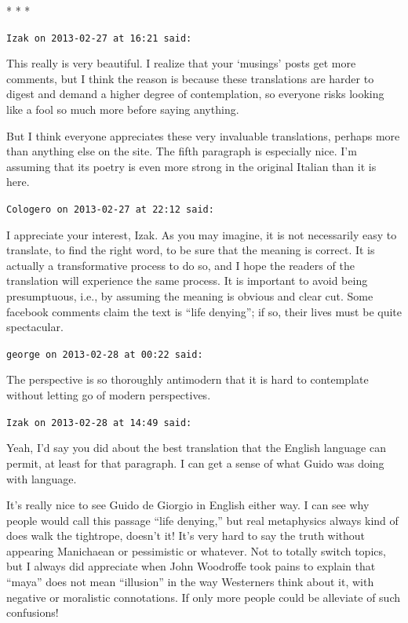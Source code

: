 
\begin{center}* * *\end{center}

\begin{footnotesize}
\begin{sffamily}
\texttt{Izak on 2013-02-27 at 16:21 said:}

This really is very beautiful. I realize that your `musings' posts get more comments, but I think the reason is because these translations are harder to digest and demand a higher degree of contemplation, so everyone risks looking like a fool so much more before saying anything.

But I think everyone appreciates these very invaluable translations, perhaps more than anything else on the site. The fifth paragraph is especially nice. I'm assuming that its poetry is even more strong in the original Italian than it is here.

\hfill

\texttt{Cologero on 2013-02-27 at 22:12 said:}

I appreciate your interest, Izak. As you may imagine, it is not necessarily easy to translate, to find the right word, to be sure that the meaning is correct. It is actually a transformative process to do so, and I hope the readers of the translation will experience the same process. It is important to avoid being presumptuous, i.e., by assuming the meaning is obvious and clear cut. Some facebook comments claim the text is ``life denying''; if so, their lives must be quite spectacular.

\hfill

\texttt{george on 2013-02-28 at 00:22 said:}

The perspective is so thoroughly antimodern that it is hard to contemplate without letting go of modern perspectives.

\hfill

\texttt{Izak on 2013-02-28 at 14:49 said:}

Yeah, I'd say you did about the best translation that the English language can permit, at least for that paragraph. I can get a sense of what Guido was doing with language.

It's really nice to see Guido de Giorgio in English either way. I can see why people would call this passage ``life denying,'' but real metaphysics always kind of does walk the tightrope, doesn't it! It's very hard to say the truth without appearing Manichaean or pessimistic or whatever. Not to totally switch topics, but I always did appreciate when John Woodroffe took pains to explain that ``maya'' does not mean ``illusion'' in the way Westerners think about it, with negative or moralistic connotations. If only more people could be alleviate of such confusions!


\end{sffamily}
\end{footnotesize}
